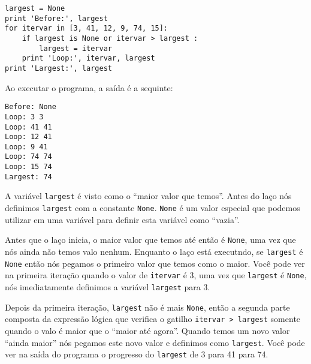 \beforeverb
\begin{verbatim}
largest = None
print 'Before:', largest
for itervar in [3, 41, 12, 9, 74, 15]:
    if largest is None or itervar > largest :
        largest = itervar
    print 'Loop:', itervar, largest
print 'Largest:', largest
\end{verbatim}
\afterverb
%
%
Ao executar o programa, a saída é a sequinte:
\beforeverb
\begin{verbatim}
Before: None
Loop: 3 3
Loop: 41 41
Loop: 12 41
Loop: 9 41
Loop: 74 74
Loop: 15 74
Largest: 74
\end{verbatim}
\afterverb
%
%
A variável {\tt largest} é visto como o ``maior valor que temos''. Antes do
laço nós definimos {\tt largest} com a constante {\tt None}. {\tt None} é um
valor especial que podemos utilizar em uma variável para definir esta
variável como ``vazia''.


Antes que o laço inicia, o maior valor que temos até então é {\tt None}, uma
vez que nós ainda não temos valo nenhum. Enquanto o laço está executndo, se
{\tt largest} é {\tt None} então nós pegamos o primeiro valor que temos como
o maior. Você pode ver na primeira iteração quando o valor de {\tt itervar} é
3, uma vez que {\tt largest} é {\tt None}, nós imediatamente definimos a
variável {\tt largest} para 3.


Depois da primeira iteração, {\tt largest} não é mais {\tt None}, então a
segunda parte composta da expressão lógica que verifica o gatilho
{\tt itervar > largest} somente quando o valo é maior que o ``maior até agora''.
Quando temos um novo valor ``ainda maior'' nós pegamos este novo valor e
definimos como {\tt largest}. Você pode ver na saída do programa o
progresso do {\tt largest} de 3 para 41 para 74.

